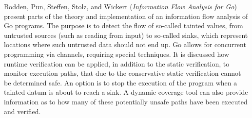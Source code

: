 

Bodden, Pun, Steffen, Stolz, and Wickert
\cite{isola-2016-bodden}
({\em Information Flow Analysis for Go})
present parts of the theory and implementation of 
an information flow analysis of Go programs. The purpose is
to detect the flow of so-called tainted values, from untrusted sources (such as reading from input) to so-called sinks, 
which represent locations where such untrusted data should not end up.  Go allows for concurrent programming via channels, requiring
special techniques. It is discussed how runtime verification can be
applied, in addition to the  static verification, to monitor execution paths, that due to the conservative static verification cannot be determined safe. An option is to stop the execution of
the program when a tainted datum is about to reach a sink.
A dynamic coverage tool can also provide information
as to how many of these potentially unsafe paths have been executed and verified.

